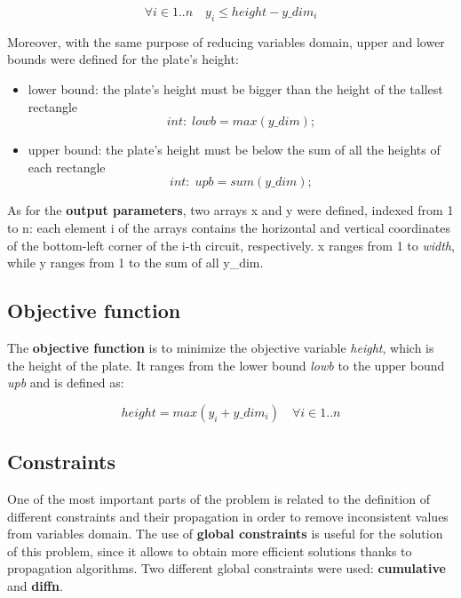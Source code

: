 \begin{equation*}
    \forall i \in {1..n} \quad y_i \leq height - y\_dim_i
\end{equation*}

Moreover, with the same purpose of reducing variables domain, upper and lower bounds were defined for the plate's height:
\begin{itemize}
    \item lower bound: the plate's height must be bigger than the height of the tallest rectangle
    \[ int: \; lowb = max(y\_dim); \]
    \item upper bound: the plate's height must be below the sum of all the heights of each rectangle
    \[int: \; upb = sum(y\_dim); \]
\end{itemize}



As for the \textbf{output parameters}, two arrays x and y were defined, indexed from 1 to n: each element i of the arrays contains the horizontal and vertical coordinates of the bottom-left corner of the i-th circuit, respectively. x ranges from 1 to \textit{width}, while y ranges from 1 to the sum of all y\_dim.

\subsection{Objective function}

The \textbf {objective function} is to minimize the objective variable \textit{height}, which is the height of the plate. It ranges from the lower bound \textit{lowb} to the upper bound \textit{upb} and is defined as:

\begin{equation*}
    height = max(y_i + y\_dim_i) \quad \forall i \in {1..n}
\end{equation*}

\subsection{Constraints}

One of the most important parts of the problem is related to the definition of different constraints and their propagation in order to remove inconsistent values from variables domain.
The use of \textbf{global constraints} is useful for the solution of this problem, since it allows to obtain more efficient solutions thanks to propagation algorithms. Two different global constraints were used: \textbf {cumulative} and \textbf {diffn}. 

